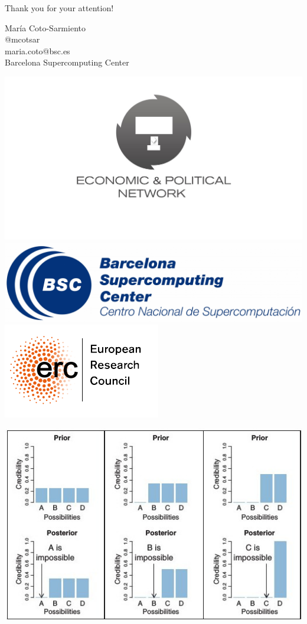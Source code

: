 \documentclass[12pt, handout=show,notes=show]{beamer}
\begin{document}
\begin{frame}
\vspace{1cm}
\Huge Thank you for your attention!\\
                                    
\begin{center}
\normalsize                 
Mar\'ia Coto-Sarmiento\\
@mcotsar\\
maria.coto@bsc.es\\
Barcelona Supercomputing Center
\end{center}

\vspace{-.3cm}
\begin{center}
		\includegraphics[height=0.12\textwidth]{./epnetlogo.jpg}
		\includegraphics[height=0.1\textwidth]{./computing.jpg}
		 \includegraphics[height=0.12\textwidth]{./ERC.png}
		\vfill
	
\end{center}		

\end{frame}

\begin{frame}

\begin{center}
 \centering
 \includegraphics[height=0.5\textwidth]{./priorposterior.jpg}
 \end{center}


\end{frame} 
\end{document}
